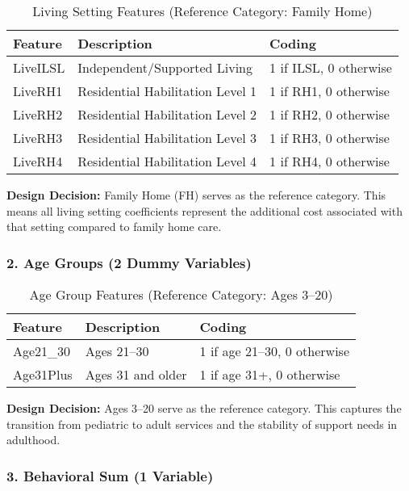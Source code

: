 \begin{table}[h]
\centering
\caption{Living Setting Features (Reference Category: Family Home)}
\begin{tabular}{lll}
\toprule
\textbf{Feature} & \textbf{Description} & \textbf{Coding} \\
\midrule
LiveILSL & Independent/Supported Living & 1 if ILSL, 0 otherwise \\
LiveRH1 & Residential Habilitation Level 1 & 1 if RH1, 0 otherwise \\
LiveRH2 & Residential Habilitation Level 2 & 1 if RH2, 0 otherwise \\
LiveRH3 & Residential Habilitation Level 3 & 1 if RH3, 0 otherwise \\
LiveRH4 & Residential Habilitation Level 4 & 1 if RH4, 0 otherwise \\
\bottomrule
\end{tabular}
\end{table}

\textbf{Design Decision:} Family Home (FH) serves as the reference category. This means all living setting coefficients represent the additional cost associated with that setting compared to family home care.

\subsubsection{2. Age Groups (2 Dummy Variables)}

\begin{table}[h]
\centering
\caption{Age Group Features (Reference Category: Ages 3--20)}
\begin{tabular}{lll}
\toprule
\textbf{Feature} & \textbf{Description} & \textbf{Coding} \\
\midrule
Age21\_30 & Ages 21--30 & 1 if age 21--30, 0 otherwise \\
Age31Plus & Ages 31 and older & 1 if age 31+, 0 otherwise \\
\bottomrule
\end{tabular}
\end{table}

\textbf{Design Decision:} Ages 3--20 serve as the reference category. This captures the transition from pediatric to adult services and the stability of support needs in adulthood.

\subsubsection{3. Behavioral Sum (1 Variable)}

